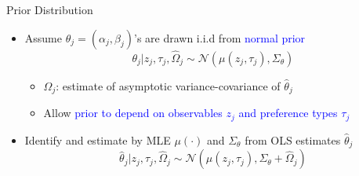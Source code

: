 \documentclass[compress,10pt,aspectratio=169]{beamer}
\newcommand\emphblue[1]{\textcolor{blue}{#1}}
\begin{document}
\begin{frame}{Prior Distribution}
    \begin{itemize}
        \item Assume $\theta_j=(\alpha_j,\beta_j)$'s are drawn i.i.d from \emphblue{normal prior}
        $$
        \theta_j|z_j,\tau_j,\hat{\Omega}_j \sim \mathcal{N}(\mu(z_j,\tau_j),\Sigma_{\theta})
        $$
        \begin{itemize}
            \item[$\Rightarrow$] $\hat{\Omega}_j$: estimate of asymptotic variance-covariance of $\hat{\theta}_j$
            \medskip
            \item[$\Rightarrow$] Allow \emphblue{prior to depend on observables $z_j$ and preference types $\tau_j$}
        \end{itemize}
        \bigskip
        \item Identify and estimate by MLE $\mu(\cdot)$ and $\Sigma_{\theta}$ from OLS estimates $\hat{\theta}_j$
        $$
        \hat{\theta}_j|z_j,\tau_j,\hat{\Omega}_j \sim \mathcal{N}(\mu(z_j,\tau_j),\Sigma_{\theta}+\hat{\Omega}_j)
        $$
    \end{itemize}
\end{frame}
\end{document}
